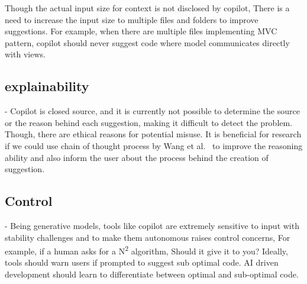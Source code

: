 Though the actual input size for context is not disclosed by copilot, There is a need to increase the input size to multiple files and folders to improve suggestions. For example, when there are multiple files implementing MVC pattern, copilot should never suggest code where model communicates directly with views.

\subsection{explainability} - Copilot is closed source, and it is currently not possible to determine the source or the reason behind each suggestion, making it difficult to detect the problem. Though, there are ethical reasons for potential misuse. It is beneficial for research if we could use chain of thought process by Wang et al.~\cite{chain_of_thought} to improve the reasoning ability and also inform the user about the process behind the creation of suggestion.

\subsection{Control} - Being generative models, tools like copilot are extremely sensitive to input with stability challenges and to make them autonomous raises control concerns, For example, if a human asks for a N\textsuperscript{2} algorithm, Should it give it to you? Ideally, tools should warn users if prompted to suggest sub optimal code. AI driven development should learn to differentiate between optimal and sub-optimal code. 

